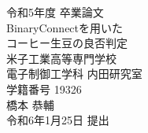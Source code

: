 

\begin{titlepage}
	\begin{center}
		\vspace*{30truept}
		{\Large 令和5年度 卒業論文} \\
		\vspace{100truept}
		{\LARGE BinaryConnectを用いた}\\
		\vspace{12truept}
		{\LARGE コーヒー生豆の良否判定} 
		\vspace{80truept}\\
		{\large
		米子工業高等専門学校\\
		電子制御工学科 内田研究室\\
		}
		\vspace{50truept}
		{\large 学籍番号 19326}\\ %
	
		\vspace{10truept}
		{\large  橋本 恭輔}\\ %
	
		\vspace{50truept}
		{\large 令和6年1月25日 提出}\\ %
	\end{center}
\end{titlepage}


